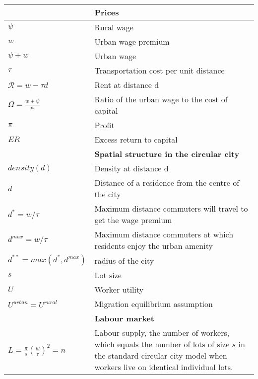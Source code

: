\begin{longtable}{lp{10cm}}
            & \textbf{Prices} \\ \hline
$\psi$      &  Rural wage \\
$w$         &  Urban wage premium \\
$\psi + w$  &  Urban wage \\
$\tau$      &  Transportation cost per unit distance \\
 $\mathcal{R} = w-\tau d$ & Rent at distance d  \\ 
$\Omega=\frac{w+\psi}{\psi}$  &  Ratio of the urban wage to the  cost of capital \\
$\pi$	   & Profit \\
$ER$	   & Excess return to capital \\ \hline

		&\textbf{Spatial structure in the circular city} \\ \hline		
$density(d)$        & {\color{red}Density at distance d} \\
$d$  &  Distance of a residence from the centre of the city \\
$d^* = w/\tau$      &  Maximum distance commuters will travel to get the wage premium \\
$d^{max} = w/\tau$  &  Maximum distance commuters at which residents enjoy the urban amenity \\
$d^{**} = max(d^*, d^{max})$  &  radius of the city \\
$s$                 &  Lot size \\
$U$                 &  Worker utility \\%
$U^{urban}=U^{rural} $  &   Migration equilibrium assumption \\
\hline

		& \textbf{Labour market} \\ \hline
$L= \frac{\pi}{s}(\frac{w}{\tau})^2 = n$  &  
Labour supply, the number of workers, which equals the number of lots of size $s$ in the standard circular city model when workers live on identical individual lots. %
\\  \hline


\end{longtable}
